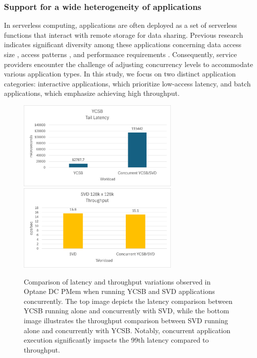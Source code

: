 \subsubsection{Support for a wide heterogeneity of applications}

In serverless computing, applications are often deployed as a set of serverless functions that interact with remote storage for data sharing. Previous research indicates significant diversity among these applications concerning data access size \cite{klimovic2018pocket,romero2021faat}, access patterns \cite{romero2021faat}, and performance requirements \cite{180275,jonas2019cloud}. Consequently, service providers encounter the challenge of adjusting concurrency levels to accommodate various application types. In this study, we focus on two distinct application categories: interactive applications, which prioritize low-access latency, and batch applications, which emphasize achieving high throughput.


\begin{figure}[ht]
  \centering
  \includegraphics[width=0.7\textwidth,height=\textheight,keepaspectratio,angle=0]{images/measurement-study-latency.png}
  \includegraphics[width=0.7\textwidth,height=\textheight,keepaspectratio,angle=0]{images/measurement-study-tp.png}
  \caption[Impact of Concurrent Applications on Optane DC PMem Latency and Throughput]{Comparison of latency and throughput variations observed in Optane DC PMem when running YCSB and SVD applications concurrently. The top image depicts the latency comparison between YCSB running alone and concurrently with SVD, while the bottom image illustrates the throughput comparison between SVD running alone and concurrently with YCSB. Notably, concurrent application execution significantly impacts the 99th latency compared to throughput.}
  \label{fig:measurement_study}
\end{figure}

